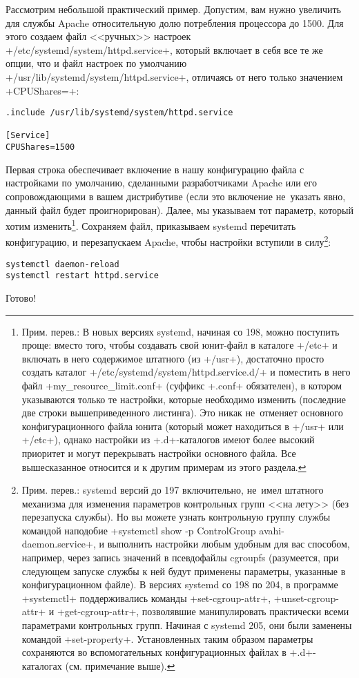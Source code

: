 \documentclass[10pt,oneside,a4paper]{article}
\begin{document}
Рассмотрим небольшой практический пример. Допустим, вам нужно увеличить
для службы Apache относительную долю потребления процессора до 1500. Для этого
создаем файл <<ручных>> настроек +/etc/systemd/system/httpd.service+, который
включает в себя все те же опции, что и файл настроек по умолчанию
+/usr/lib/systemd/system/httpd.service+, отличаясь от него только значением
+CPUShares=+:
\begin{Verbatim}
.include /usr/lib/systemd/system/httpd.service

[Service]
CPUShares=1500
\end{Verbatim}
Первая строка обеспечивает включение в нашу конфигурацию файла с настройками по
умолчанию, сделанными разработчиками Apache или его сопровождающими в вашем
дистрибутиве (если это включение не~указать явно, данный файл будет
проигнорирован).  Далее, мы указываем тот параметр, который хотим
изменить\footnote{Прим. перев.: В новых версиях systemd, начиная со 198, можно
поступить проще: вместо того, чтобы создавать свой юнит-файл в каталоге +/etc+ и
включать в него содержимое штатного (из +/usr+), достаточно просто создать
каталог +/etc/systemd/system/httpd.service.d/+ и поместить в него файл
+my_resource_limit.conf+ (суффикс +.conf+ обязателен), в котором указываются
только те настройки, которые необходимо изменить (последние две строки
вышеприведенного листинга). Это никак не~отменяет основного конфигурационного
файла юнита (который может находиться в +/usr+ или +/etc+), однако настройки из
+.d+-каталогов имеют более высокий приоритет и могут перекрывать настройки
основного файла. Все вышесказанное относится и к другим примерам из этого
раздела.}. Сохраняем файл, приказываем systemd перечитать конфигурацию, и
перезапускаем Apache, чтобы настройки вступили в силу\footnote{Прим. перев.:
systemd версий до 197 включительно, не~имел штатного механизма для изменения
параметров контрольных групп <<на лету>> (без перезапуска службы). Но вы можете
узнать контрольную группу службы командой наподобие
+systemctl show -p ControlGroup avahi-daemon.service+, и выполнить настройки
любым удобным для вас способом, например, через запись значений в псевдофайлы
cgroupfs (разумеется, при следующем запуске службы к ней будут применены
параметры, указанные в конфигурационном файле). В версиях systemd со 198 по 204,
в программе +systemctl+ поддерживались команды +set-cgroup-attr+,
+unset-cgroup-attr+ и +get-cgroup-attr+, позволявшие манипулировать практически
всеми параметрами контрольных групп. Начиная с systemd 205, они были заменены
командой +set-property+. Установленных таким образом параметры сохраняются во
вспомогательных конфигурационных файлах в +.d+-каталогах (см. примечание
выше).}:
\begin{Verbatim}
systemctl daemon-reload
systemctl restart httpd.service
\end{Verbatim}
Готово!
\end{document}

